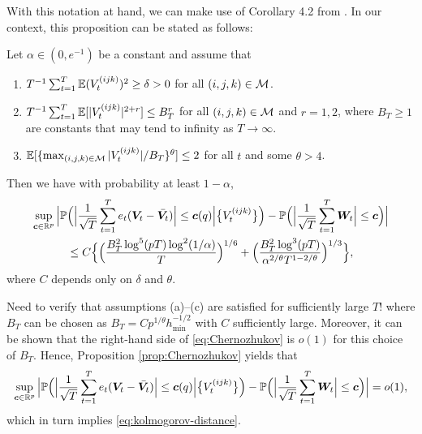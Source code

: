 \documentclass[a4paper,11pt]{article}
\numberwithin{equation}{section}
\begin{document}
With this notation at hand, we can make use of Corollary 4.2 from \cite{Chernozhukov2017}. In our context, this proposition can be stated as follows: 
\begin{propA}\label{prop:Chernozhukov}
Let $\alpha\in (0, e^{-1})$ be a constant and assume that 
\begin{enumerate}[label=(\alph*),leftmargin=0.7cm]
\item $T^{-1} \sum_{t=1}^T \mathbb{E} (V^{(ijk)}_t)^2 \ge \delta > 0$ for all $(i,j,k) \in \mathcal{M}$.
\item $T^{-1} \sum_{t=1}^T \mathbb{E}[ |V^{(ijk)}_t|^{2+r} ] \le B_T^r$ for all $(i,j,k) \in \mathcal{M}$ and $r=1,2$, where $B_T \ge 1$ are constants that may tend to infinity as $T \rightarrow \infty$.  
\item $\mathbb{E}[ \{ \max_{(i,j,k) \in \mathcal{M}} |V^{(ijk)}_t| / B_T \}^\theta ] \le 2$ for all $t$ and some $\theta > 4$.  
\end{enumerate}
Then  we have with probability at least $1 - \alpha$,
\begin{align}
\sup_{\boldsymbol{c} \in \mathbb{R}^p} \Big| \mathbb{P} &\Big( \Big| \frac{1}{\sqrt{T}} \sum_{t=1}^T e_t (\boldsymbol{V}_t - \bar{\boldsymbol{V}_t}) \Big| \leq \boldsymbol{c}(q) \Big| \big\{V_t^{(ijk)}\big\} \Big)  - \mathbb{P} \Big( \Big|\frac{1}{\sqrt{T}} \sum_{t=1}^T \boldsymbol{W}_t\Big| \le \boldsymbol{c} \Big) \Big| \nonumber \\ & \le C \Big\{ \Big( \frac{B_T^2 \log^5(pT)\log^2(1/\alpha)}{T} \Big)^{1/6} + \Big( \frac{B_T^2 \log^3(pT)}{\alpha^{2/\theta}T^{1-2/\theta}} \Big)^{1/3} \Big\}, \label{eq:Chernozhukov}
\end{align}
where $C$ depends only on $\delta$ and $\theta$. 
\end{propA}
{\color{red}
Need to verify that assumptions (a)--(c) are satisfied for sufficiently large $T$! where $B_T$ can be chosen as $B_T = C p^{1/\theta} h_{\min}^{-1/2}$ with $C$ sufficiently large. Moreover, it can be shown that the right-hand side of \eqref{eq:Chernozhukov} is $o(1)$ for this choice of $B_T$. Hence, Proposition \ref{prop:Chernozhukov} yields that 
\[ \sup_{\boldsymbol{c} \in \mathbb{R}^p} \Big| \mathbb{P} \Big( \Big| \frac{1}{\sqrt{T}} \sum_{t=1}^T e_t (\boldsymbol{V}_t - \bar{\boldsymbol{V}_t}) \Big| \leq \boldsymbol{c}(q) \Big| \big\{V_t^{(ijk)}\big\} \Big) - \mathbb{P} \Big( \Big|\frac{1}{\sqrt{T}} \sum_{t=1}^T \boldsymbol{W}_t\Big| \le \boldsymbol{c} \Big) \Big| = o(1), \]
which in turn implies \eqref{eq:kolmogorov-distance}. 
}

{\small
\setlength{\bibsep}{0.35em}
}
\end{document}
